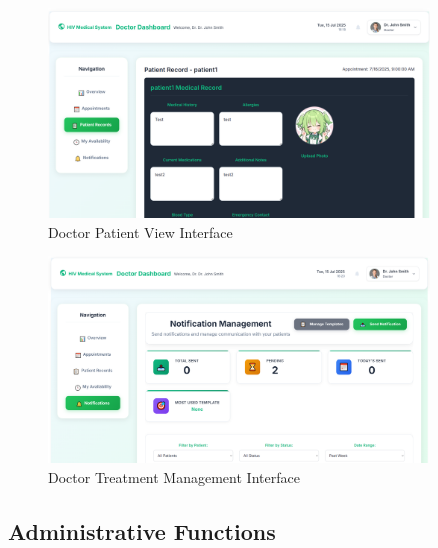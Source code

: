 \documentclass[12pt,a4paper]{article}
\begin{document}
\begin{figure}[H]
\centering
\includegraphics[width=0.9\textwidth]{images/doctor_patientview.png}
\caption{Doctor Patient View Interface}
\label{fig:doctor-patientview}
\end{figure}

\begin{figure}[H]
\centering
\includegraphics[width=0.9\textwidth]{images/doctor_treatment.png}
\caption{Doctor Treatment Management Interface}
\label{fig:doctor-treatment}
\end{figure}

\subsection{Administrative Functions}
\end{document}
